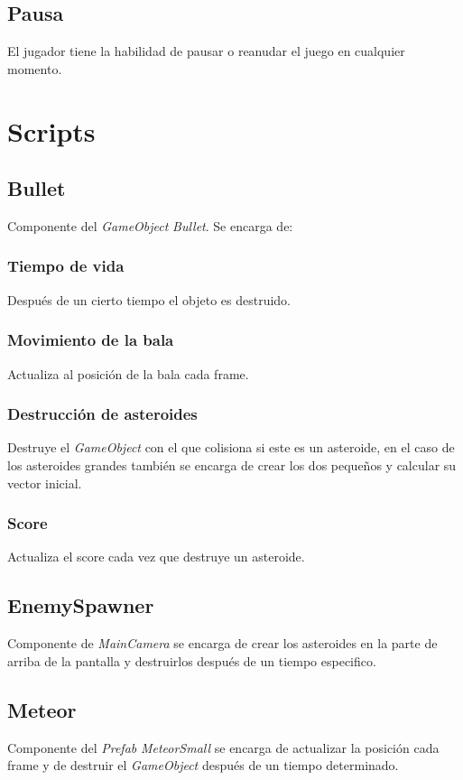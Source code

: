 \documentclass[journal]{IEEEtran}
\begin{document}
\subsection*{Pausa}
El jugador tiene la habilidad de pausar o reanudar el juego en cualquier
momento.


\section*{Scripts}

\subsection*{Bullet}
Componente del \textit{GameObject} \textit{Bullet}. Se encarga de:

\subsubsection*{Tiempo de vida}
Después de un cierto tiempo el objeto es destruido.
\subsubsection*{Movimiento de la bala}
Actualiza al posición de la bala cada frame.
\subsubsection*{Destrucción de asteroides}
Destruye el \textit{GameObject} con el que colisiona si este es un asteroide,
en el caso de los asteroides grandes también se encarga de crear los dos
pequeños y calcular su vector inicial.
\subsubsection*{Score}
Actualiza el score cada vez que destruye un asteroide.

\subsection*{EnemySpawner}
Componente de \textit{MainCamera} se encarga de crear los asteroides en la
parte de arriba de la pantalla y destruirlos después de un tiempo especifico.

\subsection*{Meteor}
Componente del \textit{Prefab} \textit{MeteorSmall} se encarga de actualizar la
posición cada frame y de destruir el \textit{GameObject} después de un tiempo
determinado.
\end{document}
